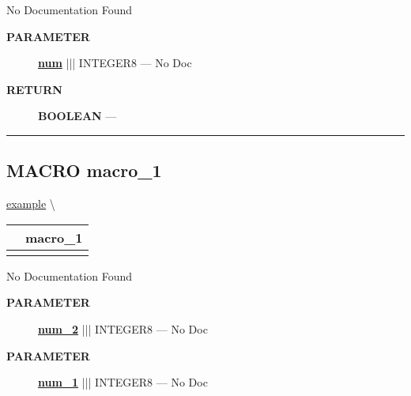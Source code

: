 \par





No Documentation Found






\par
\begin{description}
\item [\colorbox{tagtype}{\color{white} \textbf{\textsf{PARAMETER}}}] \textbf{\underline{num}} ||| INTEGER8 --- No Doc
\end{description}







\par
\begin{description}
\item [\colorbox{tagtype}{\color{white} \textbf{\textsf{RETURN}}}] \textbf{BOOLEAN} --- 
\end{description}




\rule{\linewidth}{0.5pt}
\subsection*{\textsf{\colorbox{headtoc}{\color{white} MACRO}
macro\_1}}

\hypertarget{ecldoc:example.macro_1}{}
\hspace{0pt} \hyperlink{ecldoc:example}{example} \textbackslash 

{\renewcommand{\arraystretch}{1.5}
\begin{tabularx}{\textwidth}{|>{\raggedright\arraybackslash}l|X|}
\hline
\hspace{0pt}\mytexttt{\color{red} } & \textbf{macro\_1} \\
\hline
\multicolumn{2}{|>{\raggedright\arraybackslash}X|}{\hspace{0pt}\mytexttt{\color{param} (num\_1, num\_2)}} \\
\hline
\end{tabularx}
}

\par





No Documentation Found






\par
\begin{description}
\item [\colorbox{tagtype}{\color{white} \textbf{\textsf{PARAMETER}}}] \textbf{\underline{num\_2}} ||| INTEGER8 --- No Doc
\item [\colorbox{tagtype}{\color{white} \textbf{\textsf{PARAMETER}}}] \textbf{\underline{num\_1}} ||| INTEGER8 --- No Doc
\end{description}







